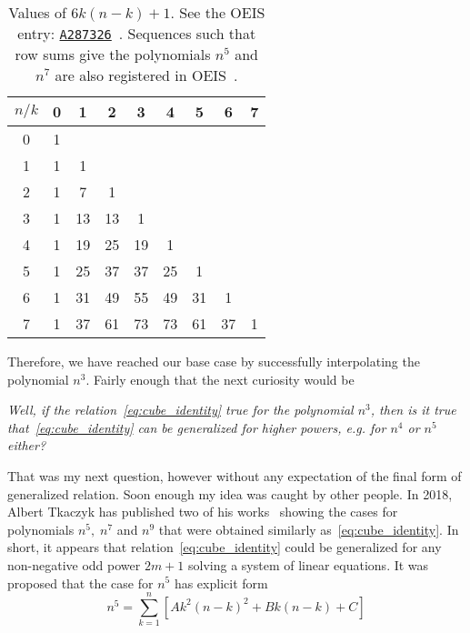 \begin{table}[H]
    \setlength\extrarowheight{-6pt}
    \begin{tabular}{c|cccccccc}
        $n/k$ & 0 & 1  & 2  & 3  & 4  & 5  & 6  & 7 \\
        \hline
        0     & 1 &    &    &    &    &    &    &   \\
        1     & 1 & 1  &    &    &    &    &    &   \\
        2     & 1 & 7  & 1  &    &    &    &    &   \\
        3     & 1 & 13 & 13 & 1  &    &    &    &   \\
        4     & 1 & 19 & 25 & 19 & 1  &    &    &   \\
        5     & 1 & 25 & 37 & 37 & 25 & 1  &    &   \\
        6     & 1 & 31 & 49 & 55 & 49 & 31 & 1  &   \\
        7     & 1 & 37 & 61 & 73 & 73 & 61 & 37 & 1
    \end{tabular}
    \caption{Values of $6k(n-k) + 1$.
    See the OEIS entry: \href{https://oeis.org/A287326}{\texttt{A287326}}~\cite{kolosov2017third}.
    Sequences such that row sums give the polynomials $n^{5}$ and $n^7$
        are also registered in OEIS~\cite{kolosov2018fifth, kolosov2018seventh}.}
    \label{tab:fig_1}
\end{table}
Therefore, we have reached our base case by successfully interpolating the polynomial $n^3$.
Fairly enough that the next curiosity would be
\begin{center}
    \textit{Well, if the relation~\eqref{eq:cube_identity} true for the polynomial $n^3$,
        then is it true that~\eqref{eq:cube_identity} can be generalized for higher powers, e.g. for $n^4$ or $n^5$ either?}
\end{center}
That was my next question, however without any expectation of the final form of generalized relation.
Soon enough my idea was caught by other people.
In 2018, Albert Tkaczyk has published two of his works~\cite{tkaczyk2018problem, tkaczyk2018continuation}
showing the cases for polynomials $n^5, \; n^7$ and $n^9$ that were obtained similarly as~\eqref{eq:cube_identity}.
In short, it appears that relation~\eqref{eq:cube_identity} could be generalized
for any non-negative odd power $2m+1$ solving a system of linear equations.
It was proposed that the case for $n^5$ has explicit form
\begin{equation*}
    n^5 = \sum_{k=1}^{n} \left[ A k^2(n-k)^2 + Bk(n-k) + C \right]
\end{equation*}
